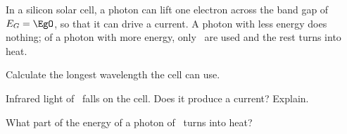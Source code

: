 In a silicon solar cell, a photon can lift one electron across the band gap of $E_G = \EgO$, so that it can drive a current. A photon with less energy does nothing; of a photon with more energy, only \EgO\ are used and the rest turns into heat.

\begin{abcliste}
\abc Calculate the longest wavelength the cell can use.

\abc Infrared light of \lirO\ falls on the cell. Does it produce a current? Explain.

\abc What part of the energy of a photon of \laO\ turns into heat?
\end{abcliste}
